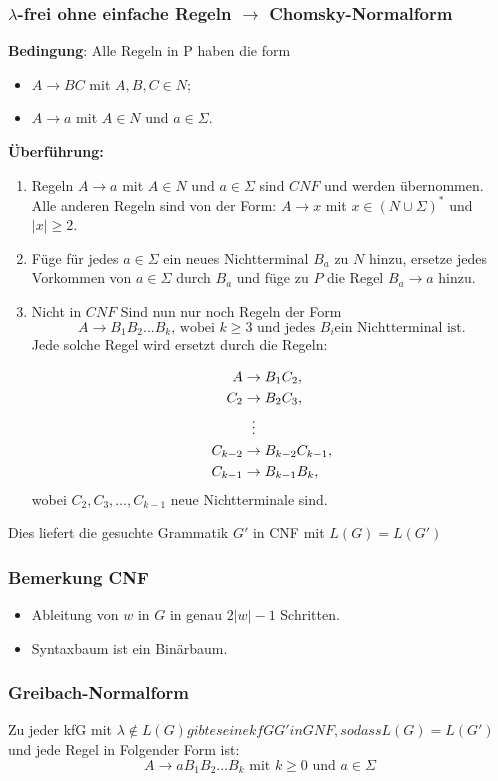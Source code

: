 \documentclass[9pt]{article}
\begin{document}
\subsubsection{$\lambda$-frei ohne einfache Regeln $\to$ Chomsky-Normalform}
\textbf{Bedingung}: Alle Regeln in P haben die form
\begin{itemize}
	\item $A \to BC$ mit $A, B, C \in N$;
	\item $A \to a$ mit $A \in N$ und $a \in \Sigma$.
\end{itemize}
\textbf{Überführung:}
\begin{enumerate}
	\item Regeln $A \to a$ mit $A \in N$ und $a \in \Sigma$ sind $CNF$ und werden übernommen. Alle anderen Regeln sind von der Form: $A \to x$ mit $x \in (N \cup \Sigma)^*$ und $|x| \geq 2$.
	\item Füge für jedes $a \in \Sigma$ ein neues Nichtterminal $B_a$ zu $N$ hinzu, ersetze jedes Vorkommen von $a \in \Sigma$ durch $B_a$ und füge zu $P$ die Regel $B_a \to a$ hinzu.
	\item Nicht in $CNF$ Sind nun nur noch Regeln der Form
	$$A \to B_1B_2\dots B_k\text{, wobei } k \geq 3 \text{ und jedes } B_i \text{ein Nichtterminal ist.}$$
	Jede solche Regel wird ersetzt durch die Regeln:
	
	\begin{align*}
	A &\to B_1 C_2,\\
	C_2 &\to B_2 C_3,\\
    &\vdotswithin{\to}\\
	C_{k-2} &\to B_{k-2}C_{k-1},\\
	C_{k-1} &\to B_{k-1}B_k,
	\end{align*}
	wobei $C_2, C_3, \dots , C_{k-1}$ neue Nichtterminale sind.
\end{enumerate}
Dies liefert die gesuchte Grammatik $G'$ in CNF mit $L(G) = L(G')$
\subsubsection{Bemerkung CNF}
\begin{itemize}
	\item Ableitung von $w$ in $G$ in genau $2|w|-1$ Schritten.
	\item Syntaxbaum ist ein Binärbaum.
\end{itemize}
\subsubsection{Greibach-Normalform}
Zu jeder kfG mit $\lambda \notin L(G) gibt es eine kfG G' in GNF, so dass L(G) = L(G')$ und jede Regel in Folgender Form ist:
$$A \to aB_1B_2 \dots B_k \text{ mit } k \geq 0 \text{ und } a \in \Sigma$$
\end{document}
